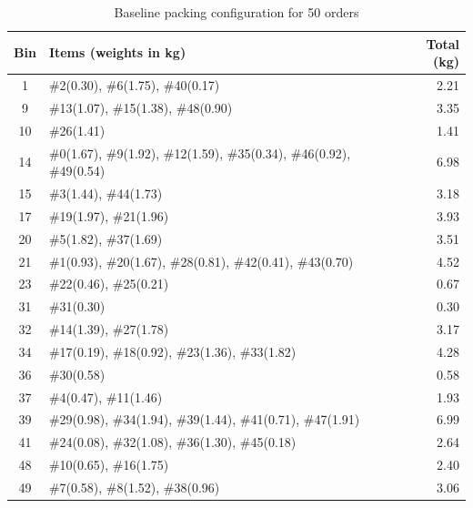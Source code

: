 \documentclass[journal,12pt,onecolumn]{IEEEtran}
\begin{document}
\begin{table}[htbp!]
\centering
\caption{Baseline packing configuration for 50 orders}
\label{tab:baseline50}
\begin{tabular}{|c|l|r|}
\hline
\textbf{Bin} & \textbf{Items (weights in kg)} & \textbf{Total (kg)} \\
\hline
1 & \#2(0.30), \#6(1.75), \#40(0.17) & 2.21 \\
\hline
9 & \#13(1.07), \#15(1.38), \#48(0.90) & 3.35 \\
\hline
10 & \#26(1.41) & 1.41 \\
\hline
14 & \#0(1.67), \#9(1.92), \#12(1.59), \#35(0.34), \#46(0.92), \#49(0.54) & 6.98 \\
\hline
15 & \#3(1.44), \#44(1.73) & 3.18 \\
\hline
17 & \#19(1.97), \#21(1.96) & 3.93 \\
\hline
20 & \#5(1.82), \#37(1.69) & 3.51 \\
\hline
21 & \#1(0.93), \#20(1.67), \#28(0.81), \#42(0.41), \#43(0.70) & 4.52 \\
\hline
23 & \#22(0.46), \#25(0.21) & 0.67 \\
\hline
31 & \#31(0.30) & 0.30 \\
\hline
32 & \#14(1.39), \#27(1.78) & 3.17 \\
\hline
34 & \#17(0.19), \#18(0.92), \#23(1.36), \#33(1.82) & 4.28 \\
\hline
36 & \#30(0.58) & 0.58 \\
\hline
37 & \#4(0.47), \#11(1.46) & 1.93 \\
\hline
39 & \#29(0.98), \#34(1.94), \#39(1.44), \#41(0.71), \#47(1.91) & 6.99 \\
\hline
41 & \#24(0.08), \#32(1.08), \#36(1.30), \#45(0.18) & 2.64 \\
\hline
48 & \#10(0.65), \#16(1.75) & 2.40 \\
\hline
49 & \#7(0.58), \#8(1.52), \#38(0.96) & 3.06 \\
\hline
\end{tabular}
\end{table}
\end{document}
